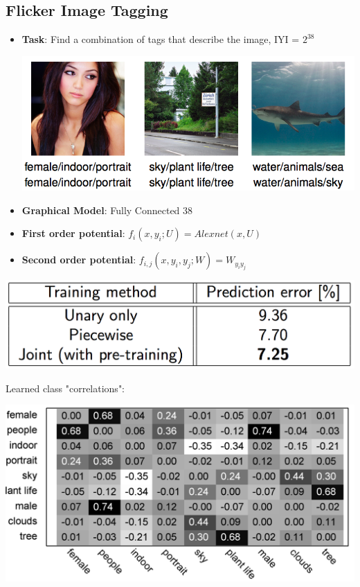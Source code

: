 \documentclass{beamer}
\begin{document}
\subsection*{Flicker Image Tagging}
\begin{frame}
	\begin{itemize}
		\item \textbf{Task}: Find a combination of tags that describe the image, IYI = $2^{38}$
		\begin{center}
			\includegraphics[scale=0.25]{img/flicker1} 
		\end{center}
		
		\item \textbf{Graphical Model}: Fully Connected 38 
		\item \textbf{First order potential}: $f_i(x, y_i; U) = Alexnet(x, U)$
		\item \textbf{Second order potential}: $f_{i, j}(x, y_i, y_j; W) = W_{y_iy_j}$
	\end{itemize}
	
	\begin{center}
		\includegraphics[scale=0.2]{img/flicker2}
	\end{center}
\end{frame}

\begin{frame}
	Learned class "correlations":
	\begin{center}
		\includegraphics[scale=0.2]{img/flicker3}
	\end{center}
\end{frame}
\end{document}
